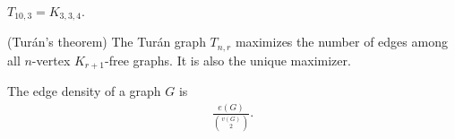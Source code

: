 \documentclass[11pt]{article}
\begin{document}
\begin{example} $T_{10, 3} = K_{3, 3, 4}$.
\end{example}

\begin{theorem} (Turán's theorem) The Turán graph $T_{n, r}$ maximizes the number of edges among all $n$-vertex $K_{r+1}$-free graphs. It is also the unique maximizer.
\end{theorem}

\begin{definition} The edge density of a graph $G$ is \begin{align*} \frac{e(G)}{{v(G) \choose 2}}.
\end{align*}
\end{definition}
\end{document}
